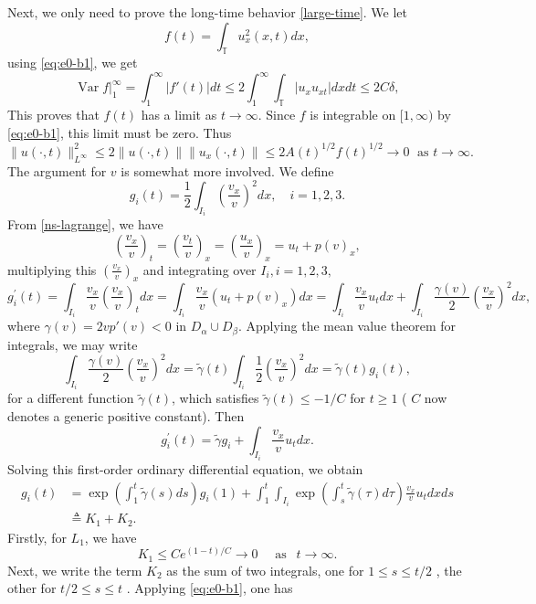 \documentclass[a4paper,oneside,11pt]{article}
\numberwithin{equation}{section}
\begin{document}
Next, we only need to prove the long-time behavior \eqref{large-time}.
We let
\[
f(t)  =\int_{\mathbb{T}}{u}_{x}^{2}(x,t) dx,
\]
using \eqref{eq:e0-b1}, we get
\[
\operatorname{Var}f\Big|_1^{\infty} = \int_1^\infty|f'(t)|dt\leq 2\int_1^\infty\int_{\mathbb{T}} |u_xu_{xt}| dxdt\leq 2C\delta,
\]
This proves that \(f(t)\) has a limit as \(t \rightarrow  \infty\). Since \(f\) is integrable on \([1,\infty )\) by \eqref{eq:e0-b1}, this limit must be zero. Thus
\begin{equation}\label{eq:large-u}
\| {u}\left( {\cdot ,t}\right) {\|}_{{L}^{\infty }}^{2} \leq  2\| u\left( {\cdot ,t}\right)\| \| {u}_{x}\left( {\cdot ,t}\right) \| \leq  {2A}{(t) }^{1/2}f{(t) }^{1/2} \rightarrow  0\;\text{ as }t \rightarrow  \infty . 
\end{equation}
The argument for \(v\) is somewhat more involved. We define
$$g_i(t)=\frac12\int_{I_i}\left(\frac{v_x}{v}\right)^2dx,\quad i=1,2,3.$$
From \eqref{ns-lagrange}, we have 
$${\left(\frac{v_x}{v}\right)}_{t}={\left(\frac{v_t}{v}\right)}_{x}={\left(\frac{u_x}{v}\right)}_{x}=u_t+p(v)_x,$$
multiplying this $\left(\frac{v_x}{v}\right)_{x}$ and integrating over $I_i, i=1,2,3,$
\[
{g}_i^{\prime}(t)  = \int_{I_i}\frac{v_x}{v}{\left(\frac{v_x}{v}\right)}_{t}{dx}= \int_{I_i}\frac{v_x}{v}\left( {{u}_{t} + {p(v)}_{x}}\right) {dx} = \int_{I_i}\frac{v_x}{v}{u}_{t}dx +\int_{I_i} \frac{\gamma(v)}{2}\left(\frac{v_x}{v}\right)^2{dx},
\]
where $\gamma(v)=2vp'(v)<0$ in $D_\alpha \cup D_\beta$. Applying the mean value theorem for integrals, we may write
\[\int_{I_i} \frac{\gamma(v)}{2}\left(\frac{v_x}{v}\right)^2{dx}=\tilde{\gamma}(t)\int_{I_i} \frac{1}{2}\left(\frac{v_x}{v}\right)^2{dx}=\tilde{\gamma}(t)g_i(t),
\]
for a different function \(\tilde{\gamma}(t)\), which satisfies \(\tilde{\gamma}(t)\leq   - 1/C\) for \(t \geq  1\) ( \(C\) now denotes a generic positive constant). Then
\[
{g}_i^{\prime}(t)  = {\tilde{\gamma} g_i} + \int_{I_i}\frac{v_x}{v}{u}_{t}dx.
\]
Solving this first-order ordinary differential equation, we obtain
\begin{align*}
\displaystyle  g_i(t)  &= \exp \left( \int_{1}^{t}\tilde{\gamma}(s)ds\right) g_i(1)  + \int_{1}^{t}\int_{I_i}\exp \left( {\int_{s}^{t}\tilde{\gamma}(\tau) {d\tau }}\right)\frac{v_x}{v}{u}_{t}{dxds}\\&\triangleq K_1+K_2.
\end{align*}
Firstly, for $L_1$, we have
$$K_1\leq C{e}^{\left( {1 - t}\right) /C} \rightarrow  0\quad \text{ as }~~ t \rightarrow  \infty.$$
Next, we write the term $K_2$ as the sum of two integrals, one for \(1 \leq  s \leq  t/2\) , the other for \(t/2 \leq  s \leq  t\) . Applying \eqref{eq:e0-b1}, one has
\end{document}
